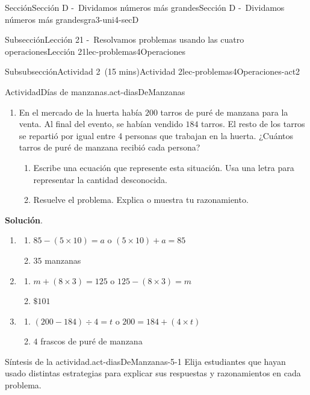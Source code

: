 \documentclass[oneside,10pt,]{article}
\newcommand{\blocktitlefont}{\relax}
\begin{document}
\begin{sectionptx}{Sección}{Sección D -~Dividamos números más grandes}{}{Sección D -~Dividamos números más grandes}{}{}{gra3-uni4-secD}
\begin{subsectionptx}{Subsección}{Lección 21 -~Resolvamos problemas usando las cuatro operaciones}{}{Lección 21}{}{}{lec-problemas4Operaciones}
\begin{subsubsectionptx}{Subsubsección}{Actividad 2~(15 mins)}{}{Actividad 2}{}{}{lec-problemas4Operaciones-act2}
\begin{activity}{Actividad}{Días de manzanas.}{act-diasDeManzanas}
\begin{enumerate}
\begin{enumerate}
\item{}Resuelve el problema. Explica o muestra tu razonamiento.%
\end{enumerate}
\item{}En el mercado de la huerta había \(200\) tarros de puré de manzana para la venta. Al final del evento, se habían vendido \(184\) tarros. El resto de los tarros se repartió por igual entre 4 personas que trabajan en la huerta. ¿Cuántos tarros de puré de manzana recibió cada persona?%
%
\begin{enumerate}
\item{}Escribe una ecuación que represente esta situación. Usa una letra para representar la cantidad desconocida.%
\item{}Resuelve el problema. Explica o muestra tu razonamiento.%
\end{enumerate}
\end{enumerate}
\par\smallskip%
\noindent\textbf{\blocktitlefont Solución}.\hypertarget{act-diasDeManzanas-3}{}\quad{}%
\begin{enumerate}
\item{}%
\begin{enumerate}
\item{}\(85 - (5 \times 10) = a\) o \((5 \times 10) + a = 85\)%
\item{}\(35\) manzanas%
\end{enumerate}
%
\item{}%
\begin{enumerate}
\item{}\(m + (8 \times 3) = 125\) o \(125 - (8 \times 3) = m\)%
\item{}\(\displaystyle \$101\)%
\end{enumerate}
%
\item{}%
\begin{enumerate}
\item{}\((200 - 184) \div 4 = t\) o \(200 = 184 + (4 \times t)\)%
\item{}\(4\) frascos de puré de manzana%
\end{enumerate}
%
\end{enumerate}
\end{activity}%
%
\par
\begin{paragraphs}{Síntesis de la actividad.}{act-diasDeManzanas-5-1}%
Elija estudiantes que hayan usado distintas estrategias para explicar sus respuestas y razonamientos en cada problema.%

\end{paragraphs}
\end{subsubsectionptx}
\end{subsectionptx}
\end{sectionptx}
\end{document}
